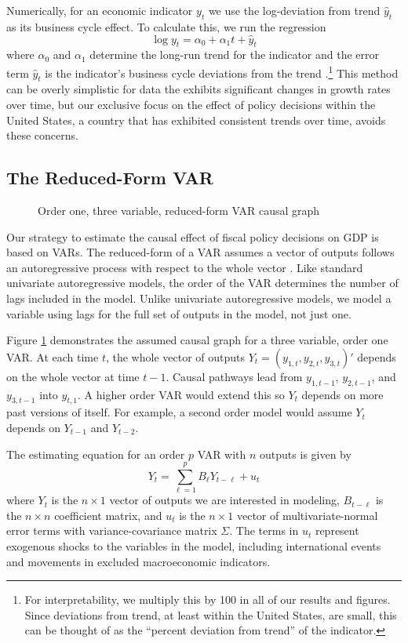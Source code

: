 Numerically, for an economic indicator $y_t$ we use the log-deviation from trend $\hat{y}_t$ as its business cycle effect. To calculate this, we run the regression
\[
    \log y_t = \alpha_0 + \alpha_1 t + \hat{y}_t
\]
where $\alpha_0$ and $\alpha_1$ determine the long-run trend for the indicator and the error term $\hat{y}_t$ is the indicator's business cycle deviations from the trend \parencite{seip2024scoring}.\footnote{For interpretability, we multiply this by 100 in all of our results and figures. Since deviations from trend, at least within the United States, are small, this can be thought of as the ``percent deviation from trend'' of the indicator.} This method can be overly simplistic for data the exhibits significant changes in growth rates over time, but our exclusive focus on the effect of policy decisions within the United States, a country that has exhibited consistent trends over time, avoids these concerns.


\subsection{The Reduced-Form VAR}

\begin{figure}[t!]
    \centering
    \caption{Order one, three variable, reduced-form VAR causal graph}
    
    \label{fig:rfvar-graph}
\end{figure}

Our strategy to estimate the causal effect of fiscal policy decisions on GDP is based on VARs. The reduced-form of a VAR assumes a vector of outputs follows an autoregressive process with respect to the whole vector \parencite{neusser2016time}. Like standard univariate autoregressive models, the order of the VAR determines the number of lags included in the model. Unlike univariate autoregressive models, we model a variable using lags for the full set of outputs in the model, not just one.

Figure \ref{fig:rfvar-graph} demonstrates the assumed causal graph for a three variable, order one VAR. At each time $t$, the whole vector of outputs $Y_t = (y_{1, t}, y_{2, t}, y_{3, t})'$ depends on the whole vector at time $t-1$. Causal pathways lead from $y_{1, t-1}$, $y_{2, t-1}$, and $y_{3, t-1}$ into $y_{t,1}$. A higher order VAR would extend this so $Y_t$ depends on more past versions of itself. For example, a second order model would assume $Y_t$ depends on $Y_{t-1}$ and $Y_{t-2}$.

The estimating equation for an order $p$ VAR with $n$ outputs is given by
\[
    Y_t = \sum_{\ell = 1}^p B_\ell Y_{t - \ell} + u_t
\]
where $Y_t$ is the $n \times 1$ vector of outputs we are interested in modeling, $B_{t - \ell}$ is the $n \times n$ coefficient matrix, and $u_t$ is the $n \times 1$ vector of multivariate-normal error terms with variance-covariance matrix $\Sigma$. The terms in $u_t$ represent exogenous shocks to the variables in the model, including international events and movements in excluded macroeconomic indicators.



